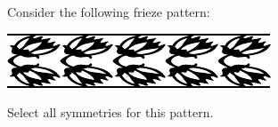 \documentclass{ximera}
\author{Bart Snapp}
\begin{document}
\begin{exercise}
  Consider the following frieze pattern:
  \begin{image}
  \includegraphics{fph3.pdf}
  \end{image}
  Select all symmetries for this pattern.
  \begin{selectAll}
  \end{selectAll}
\end{exercise}
\end{document}
